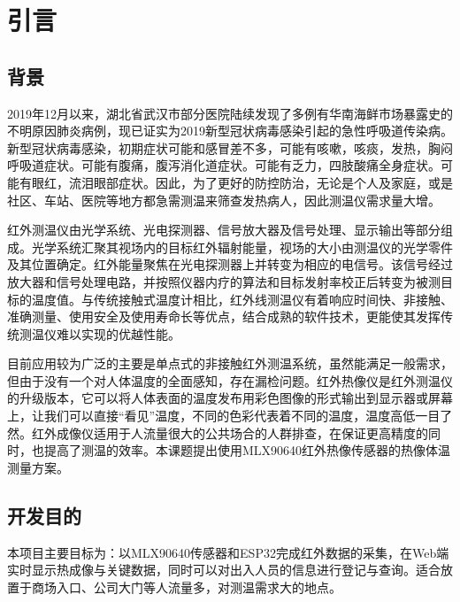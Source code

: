 \chapter{引言}
\section{背景}
2019年12月以来，湖北省武汉市部分医院陆续发现了多例有华南海鲜市场暴露史的不明原因肺炎病例，现已证实为2019新型冠状病毒感染引起的急性呼吸道传染病。新型冠状病毒感染，初期症状可能和感冒差不多，可能有咳嗽，咳痰，发热，胸闷呼吸道症状。可能有腹痛，腹泻消化道症状。可能有乏力，四肢酸痛全身症状。可能有眼红，流泪眼部症状。因此，为了更好的防控防治，无论是个人及家庭，或是社区、车站、医院等地方都急需测温来筛查发热病人，因此测温仪需求量大增。

红外测温仪由光学系统、光电探测器、信号放大器及信号处理、显示输出等部分组成。光学系统汇聚其视场内的目标红外辐射能量，视场的大小由测温仪的光学零件及其位置确定。红外能量聚焦在光电探测器上并转变为相应的电信号。该信号经过放大器和信号处理电路，并按照仪器内疗的算法和目标发射率校正后转变为被测目标的温度值。与传统接触式温度计相比，红外线测温仪有着响应时间快、非接触、准确测量、使用安全及使用寿命长等优点，结合成熟的软件技术，更能使其发挥传统测温仪难以实现的优越性能。

目前应用较为广泛的主要是单点式的非接触红外测温系统，虽然能满足一般需求，但由于没有一个对人体温度的全面感知，存在漏检问题。红外热像仪是红外测温仪的升级版本，它可以将人体表面的温度发布用彩色图像的形式输出到显示器或屏幕上，让我们可以直接“看见”温度，不同的色彩代表着不同的温度，温度高低一目了然。红外成像仪适用于人流量很大的公共场合的人群排查，在保证更高精度的同时，也提高了测温的效率。本课题提出使用MLX90640红外热像传感器的热像体温测量方案。
\section{开发目的}
本项目主要目标为：以MLX90640传感器和ESP32完成红外数据的采集，在Web端实时显示热成像与关键数据，同时可以对出入人员的信息进行登记与查询。适合放置于商场入口、公司大门等人流量多，对测温需求大的地点。
